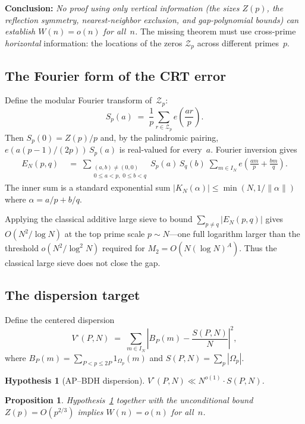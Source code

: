 \documentclass[11pt]{article}
\newtheorem{proposition}[theorem]{Proposition}
\newtheorem{hypothesis}[theorem]{Hypothesis}
\theoremstyle{definition}
\theoremstyle{remark}
\begin{document}
\textbf{Conclusion:}
\emph{No proof using only vertical information
(the sizes $Z(p)$, the reflection symmetry,
nearest-neighbor exclusion, and gap-polynomial bounds)
can establish $W(n) = o(n)$ for all~$n$.}
The missing theorem must use cross-prime
\emph{horizontal} information:
the locations of the zeros $\mathcal{Z}_p$
across different primes~$p$.

\subsection{The Fourier form of the CRT error}

Define the modular Fourier transform of~$\mathcal{Z}_p$:
\[
  S_p(a) \;=\; \frac{1}{p}\sum_{r \in \mathcal{Z}_p}
  e\!\left(\frac{ar}{p}\right).
\]
Then $S_p(0) = Z(p)/p$ and, by the palindromic pairing,
$e(a(p-1)/(2p))\,S_p(a)$ is real-valued for every~$a$.
Fourier inversion gives
\begin{align*}
  E_N(p,q) &\;=\;
  \sum_{\substack{(a,b) \ne (0,0) \\ 0 \le a < p,\; 0 \le b < q}}
  S_p(a)\,S_q(b)\;\sum_{m \in I_N}
  e\!\left(\frac{am}{p} + \frac{bm}{q}\right).
\end{align*}
The inner sum is a standard exponential sum
$|K_N(\alpha)| \le \min(N, 1/\|\alpha\|)$ where
$\alpha = a/p + b/q$.

Applying the classical additive large sieve to
bound $\sum_{p \ne q} |E_N(p,q)|$ gives
$O(N^2/\log N)$ at the top prime scale
$p \sim N$---one full logarithm larger than
the threshold $o(N^2/\log^2 N)$ required for
$M_2 = O(N(\log N)^A)$. Thus the classical
large sieve does not close the gap.

\subsection{The dispersion target}

Define the centered dispersion
\[
  V^\circ(P,N) \;=\; \sum_{m \in I_N}
  \left|B_P(m) - \frac{S(P,N)}{N}\right|^2,
\]
where $B_P(m) = \sum_{P < p \le 2P} 1_{\Omega_p}(m)$
and $S(P,N) = \sum_p |\Omega_p|$.

\begin{hypothesis}[AP--BDH dispersion]\label{hyp:ap-bdh}
$V^\circ(P,N) \ll N^{o(1)}\cdot S(P,N)$.
\end{hypothesis}

\begin{proposition}\label{prop:ap-bdh-suffices}
Hypothesis~\ref{hyp:ap-bdh} together with the
unconditional bound $Z(p) = O(p^{2/3})$
implies $W(n) = o(n)$ for all~$n$.
\end{proposition}
\end{document}
